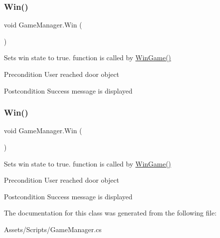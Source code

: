 \subsubsection{\texorpdfstring{Win()}{Win()}\hspace{0.1cm}{\footnotesize\ttfamily [3/4]}}
{\footnotesize\ttfamily void Game\+Manager.\+Win (\begin{DoxyParamCaption}{ }\end{DoxyParamCaption})\hspace{0.3cm}{\ttfamily [inline]}}

Sets win state to true. function is called by \mbox{\hyperlink{class_win_game}{Win\+Game()}} \begin{DoxyPrecond}{Precondition}
User reached door object 
\end{DoxyPrecond}
\begin{DoxyPostcond}{Postcondition}
Success message is displayed 
\end{DoxyPostcond}
\mbox{\label{class_game_manager_a76a27f36d082e328bd1c7748d8832816}} 
\subsubsection{\texorpdfstring{Win()}{Win()}\hspace{0.1cm}{\footnotesize\ttfamily [4/4]}}
{\footnotesize\ttfamily void Game\+Manager.\+Win (\begin{DoxyParamCaption}{ }\end{DoxyParamCaption})\hspace{0.3cm}{\ttfamily [inline]}}

Sets win state to true. function is called by \mbox{\hyperlink{class_win_game}{Win\+Game()}} \begin{DoxyPrecond}{Precondition}
User reached door object 
\end{DoxyPrecond}
\begin{DoxyPostcond}{Postcondition}
Success message is displayed 
\end{DoxyPostcond}


The documentation for this class was generated from the following file\+:\begin{DoxyCompactItemize}
\item 
Assets/\+Scripts/Game\+Manager.\+cs\end{DoxyCompactItemize}
